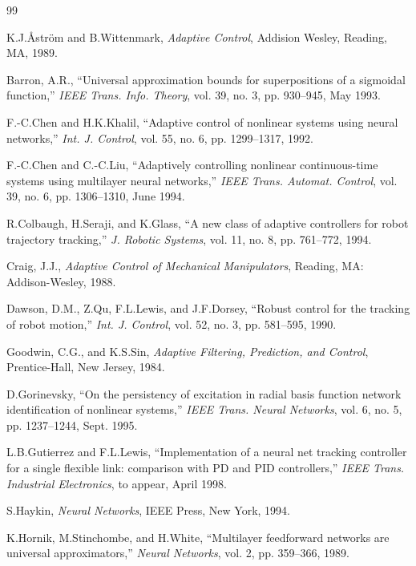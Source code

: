 \documentclass[12pt,a4paper]{ctexart}
\begin{document}
\begin{thebibliography}{99}

 K.J.\AA str\"om and B.Wittenmark, \textit{Adaptive Control}, Addision Wesley, Reading, MA, 1989.

 Barron, A.R., ``Universal approximation bounds for superpositions of a sigmoidal function,'' \textit{IEEE Trans. Info. Theory}, vol. 39, no. 3, pp. 930--945, May 1993.

 F.-C.Chen and H.K.Khalil, ``Adaptive control of nonlinear systems using neural networks,'' \textit{Int. J. Control}, vol. 55, no. 6, pp. 1299--1317, 1992.

 F.-C.Chen and C.-C.Liu, ``Adaptively controlling nonlinear continuous-time systems using multilayer neural networks,'' \textit{IEEE Trans. Automat. Control}, vol. 39, no. 6, pp. 1306--1310, June 1994.

 R.Colbaugh, H.Seraji, and K.Glass, ``A new class of adaptive controllers for robot trajectory tracking,'' \textit{J. Robotic Systems}, vol. 11, no. 8, pp. 761--772, 1994.

 Craig, J.J., \textit{Adaptive Control of Mechanical Manipulators}, Reading, MA: Addison-Wesley, 1988.

 Dawson, D.M., Z.Qu, F.L.Lewis, and J.F.Dorsey, ``Robust control for the tracking of robot motion,'' \textit{Int. J. Control}, vol. 52, no. 3, pp. 581--595, 1990.

 Goodwin, C.G., and K.S.Sin, \textit{Adaptive Filtering, Prediction, and Control}, Prentice-Hall, New Jersey, 1984.

 D.Gorinevsky, ``On the persistency of excitation in radial basis function network identification of nonlinear systems,'' \textit{IEEE Trans. Neural Networks}, vol. 6, no. 5, pp. 1237--1244, Sept. 1995.

 L.B.Gutierrez and F.L.Lewis, ``Implementation of a neural net tracking controller for a single flexible link: comparison with PD and PID controllers,'' \textit{IEEE Trans. Industrial Electronics}, to appear, April 1998.

 S.Haykin, \textit{Neural Networks}, IEEE Press, New York, 1994.

 K.Hornik, M.Stinchombe, and H.White, ``Multilayer feedforward networks are universal approximators,'' \textit{Neural Networks}, vol. 2, pp. 359--366, 1989.


\end{thebibliography}
\end{document}
